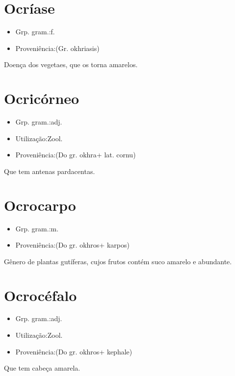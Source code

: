 \section{Ocríase}
\begin{itemize}
\item {Grp. gram.:f.}
\end{itemize}
\begin{itemize}
\item {Proveniência:(Gr. \textunderscore okhriasis\textunderscore )}
\end{itemize}
Doença dos vegetaes, que os torna amarelos.
\section{Ocricórneo}
\begin{itemize}
\item {Grp. gram.:adj.}
\end{itemize}
\begin{itemize}
\item {Utilização:Zool.}
\end{itemize}
\begin{itemize}
\item {Proveniência:(Do gr. \textunderscore okhra\textunderscore  + lat. \textunderscore cornu\textunderscore )}
\end{itemize}
Que tem antenas pardacentas.
\section{Ocrocarpo}
\begin{itemize}
\item {Grp. gram.:m.}
\end{itemize}
\begin{itemize}
\item {Proveniência:(Do gr. \textunderscore okhros\textunderscore  + \textunderscore karpos\textunderscore )}
\end{itemize}
Gênero de plantas gutíferas, cujos frutos contém suco amarelo e abundante.
\section{Ocrocéfalo}
\begin{itemize}
\item {Grp. gram.:adj.}
\end{itemize}
\begin{itemize}
\item {Utilização:Zool.}
\end{itemize}
\begin{itemize}
\item {Proveniência:(Do gr. \textunderscore okhros\textunderscore  + \textunderscore kephale\textunderscore )}
\end{itemize}
Que tem cabeça amarela.
